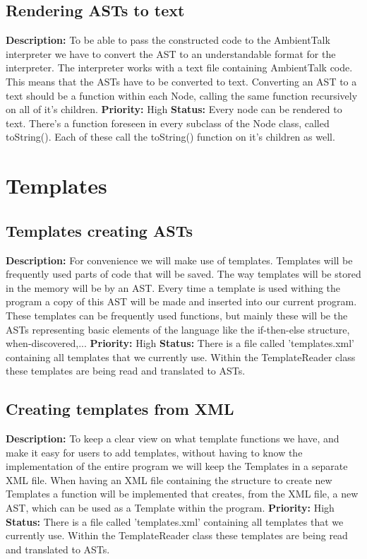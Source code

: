 \documentclass[a4paper,12pt]{report}
\begin{document}
\subsection{Rendering ASTs to text}
\textbf{Description: } To be able to pass the constructed code to the AmbientTalk interpreter we have to convert the AST to an understandable format for the interpreter. The 
interpreter works with a text file containing AmbientTalk code. This means that the ASTs have to be converted to text. Converting an
AST to a text should be a function within each Node, calling the same function recursively on all of it's children.\newline
\textbf{Priority:} High \newline
\textbf{Status: } Every node can be rendered to text. There's a function foreseen in every subclass of the Node class, called toString(). 
Each of these call the toString() function on it's children as well.\newline
\section{Templates} 
\subsection{Templates creating ASTs}
\textbf{Description: } For convenience we will make use of templates. Templates will be frequently used parts of code that will be saved. The way templates will be stored in the 
memory will be by an AST. Every time a template is used withing the program a copy of this AST will be made and inserted into our current program.
These templates can be frequently used functions, but mainly these will be the ASTs representing basic elements of the language like the if-then-else structure, when-discovered,...\newline
\textbf{Priority:} High \newline
\textbf{Status: }There is a file called 'templates.xml' containing all templates that we currently use. Within the TemplateReader class these templates are being read and translated to ASTs. \newline
\subsection{Creating templates from XML}
\textbf{Description: } To keep a clear view on what template functions we have, and make it easy for users to add templates, without having to know the implementation
of the entire program we will keep the Templates in a separate XML file. When having an XML file containing the structure to create new Templates a function will be implemented that creates, from the XML file, a new AST, which 
can be used as a Template within the program.\newline
\textbf{Priority:} High \newline
\textbf{Status: }There is a file called 'templates.xml' containing all templates that we currently use. Within the TemplateReader class these templates are being read and translated to ASTs. \newline
\end{document}
